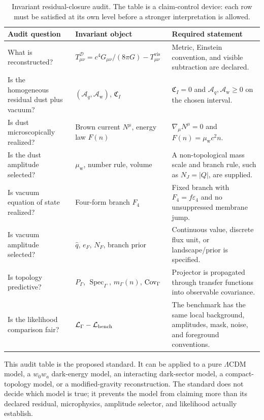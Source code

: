 \documentclass[
  aps,
  prd,
  reprint,
  superscriptaddress,
  floatfix,
  nofootinbib,
  longbibliography
]{revtex4-2}
\theoremstyle{plain}
\theoremstyle{definition}
\theoremstyle{remark}
\newcommand{\D}{\mathcal D}
\newcommand{\vis}{\mathrm{vis}}
\newcommand{\wind}{\mathrm w}
\newcommand{\Aq}{\mathcal A_q}
\newcommand{\Aw}{\mathcal A_{\mathrm w}}
\DeclareMathOperator{\Spec}{Spec}
\newcommand{\qhat}{\widehat q}
\newcommand{\NF}{N_F}
\newcommand{\eF}{e_F}
\newcommand{\PG}{P_\Gamma}
\newcommand{\LCDM}{\Lambda\mathrm{CDM}}
\begin{document}
\begin{table}[t]
\caption{Invariant residual-closure audit.  The table is a claim-control device:
each row must be satisfied at its own level before a stronger interpretation is
allowed.}
\label{tab:residual_audit_standard}
\begin{ruledtabular}
\begin{tabular}{p{}p{}p{}}
Audit question & Invariant object & Required statement \\
\hline
What is reconstructed? &
\(T^\D_{\mu\nu}=c^4G_{\mu\nu}/(8\pi G)-T^{\vis}_{\mu\nu}\) &
Metric, Einstein convention, and visible subtraction are declared. \\
Is the homogeneous residual dust plus vacuum? &
\((\Aq,\Aw)\), \(\mathfrak C_I\) &
\(\mathfrak C_I=0\) and \(\Aq,\Aw\ge0\) on the chosen interval. \\
Is dust microscopically realized? &
Brown current \(N^\mu\), energy law \(F(n)\) &
\(\nabla_\mu N^\mu=0\) and \(F(n)=\mu_{\wind}c^2n\). \\
Is the dust amplitude selected? &
\(\mu_{\wind}\), number rule, volume &
A non-topological mass scale and branch rule, such as \(N_J=|Q|\), are supplied. \\
Is vacuum equation of state realized? &
Four-form branch \(F_4\) &
Fixed branch with \(F_4=f\varepsilon_4\) and no unsuppressed membrane jump. \\
Is vacuum amplitude selected? &
\(\qhat\), \(\eF\), \(\NF\), branch prior &
Continuous value, discrete flux unit, or landscape/prior is specified. \\
Is topology predictive? &
\(\PG\), \(\Spec_\Gamma\), \(m_\Gamma(n)\), \({\rm Cov}_\Gamma\) &
Projector is propagated through transfer functions into observable covariance. \\
Is the likelihood comparison fair? &
\(\mathcal L_\Gamma-\mathcal L_{\rm bench}\) &
The benchmark has the same local background, amplitudes, mask, noise, and foreground conventions.
\end{tabular}
\end{ruledtabular}
\end{table}

This audit table is the proposed standard.  It can be applied to a pure
\(\LCDM\) model, a \(w_0w_a\) dark-energy model, an interacting dark-sector
model, a compact-topology model, or a modified-gravity reconstruction.  The
standard does not decide which model is true; it prevents the model from claiming
more than its declared residual, microphysics, amplitude selector, and likelihood
actually establish.
\end{document}
